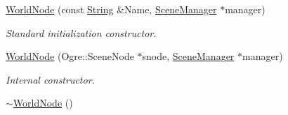 \begin{DoxyCompactItemize}
\item 
\hyperlink{classphys_1_1WorldNode_a02ab92f8a5f9da35926ef133a11a441e}{WorldNode} (const \hyperlink{namespacephys_aa03900411993de7fbfec4789bc1d392e}{String} \&Name, \hyperlink{classphys_1_1SceneManager}{SceneManager} $\ast$manager)
\begin{DoxyCompactList}\small\item\em Standard initialization constructor. \item\end{DoxyCompactList}\item 
\hyperlink{classphys_1_1WorldNode_ae813a2aa737980824725b1909372484e}{WorldNode} (Ogre::SceneNode $\ast$snode, \hyperlink{classphys_1_1SceneManager}{SceneManager} $\ast$manager)
\begin{DoxyCompactList}\small\item\em Internal constructor. \item\end{DoxyCompactList}\item 
\hypertarget{classphys_1_1WorldNode_a357c18b6e04a9ae0d0855841a3c774b2}{
\hyperlink{classphys_1_1WorldNode_a357c18b6e04a9ae0d0855841a3c774b2}{$\sim$WorldNode} ()}
\label{d2/d3e/classphys_1_1WorldNode_a357c18b6e04a9ae0d0855841a3c774b2}


\end{DoxyCompactItemize}
